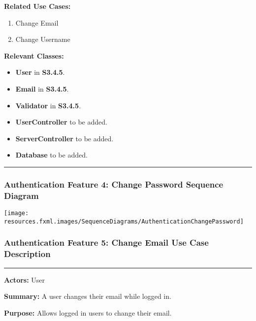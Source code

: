 \documentclass[twoside,letterpaper]{article}
\begin{document}
\noindent\textbf{Related Use Cases:}
\begin{enumerate}
	\item Change Email
	\item Change Username
\end{enumerate}

\noindent\textbf{Relevant Classes:}
\begin{itemize}
	\item \textbf{User} in \textbf{S3.4.5}.
	\item \textbf{Email} in \textbf{S3.4.5}.
	\item \textbf{Validator} in \textbf{S3.4.5}.
	\item \textbf{UserController} to be added.
	\item \textbf{ServerController} to be added.
	\item \textbf{Database} to be added.
\end{itemize}
\vspace{8pt}
\hrule
\newpage

\subsubsection[Authentication Feature 4: Change Password Sequence Diagram]{\rmfamily\bfseries\color{black}
	Authentication Feature 4: Change Password Sequence Diagram}
\hypertarget{RefHeading22059017292}{}
\label{a:sd4}
\bigskip

\texttt{[image: resources.fxml.images/SequenceDiagrams/AuthenticationChangePassword]}


\newpage

\subsubsection[Authentication Feature 5: Change Email Use Case Description]{\rmfamily\bfseries\color{black}
	Authentication Feature 5: Change Email Use Case Description}
	\label{a:uc5}
\hypertarget{RefHeading22059017292}{}

\hrule
\vspace{8pt}
\noindent\textbf{Actors:} User \newline

\noindent\textbf{Summary:} A user changes their email while logged in.  \newline

\noindent\textbf{Purpose:} Allows logged in users to change their email.  \newline
\end{document}
